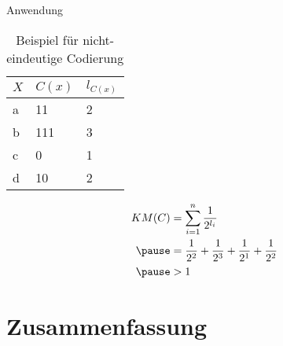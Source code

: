 \documentclass{beamer}
\begin{document}
\begin{frame}{Anwendung}

\begin{minipage}{0.49\textwidth}

\begin{table}[htb]
\caption{Beispiel für nicht-eindeutige Codierung\label{tab:example2}}
\vspace*{1em}
\centering

\bgroup
\def\arraystretch{1.3}%

\begin{tabular}[c]{l|l|l}
	
	\multicolumn{1}{c|}{\textbf{$X$}} & 
	\multicolumn{1}{c|}{\textbf{$C(x)$}} & 
	\multicolumn{1}{c}{\textbf{$l_{C(x)}$}} \\ 
	
	\hline

	a & 11 & 2\\
	b & 111 & 3\\
	c & 0 & 1\\
	d & 10 & 2\\
	
\end{tabular}
\egroup

\end{table}

\end{minipage}\pause
\hfill
\begin{minipage}{0.49\textwidth}
\begin{align*}
KM(C) &= \sum_{i=1}^{n} \frac{1}{2^{l_{i}}} \\\pause
& = \frac{1}{2^{2}} + \frac{1}{2^{3}} + \frac{1}{2^{1}} + \frac{1}{2^{2}}\\\pause
& > 1
\end{align*}
\end{minipage}

\end{frame}

\section{Zusammenfassung}
\end{document}
